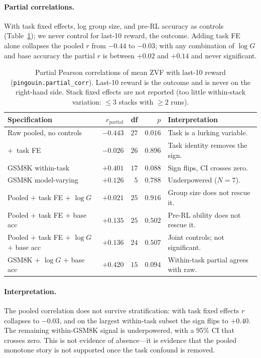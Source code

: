 \documentclass{article}
\begin{document}
\paragraph{Partial correlations.}
With task fixed effects, log group size, and pre-RL accuracy as controls
(Table~\ref{tab:zvf-partials}); we never control for last-10 reward, the
outcome. Adding task FE alone collapses the pooled $r$ from $-0.44$ to
$-0.03$; with any combination of $\log G$ and base accuracy the partial $r$
is between $+0.02$ and $+0.14$ and never significant.

\begin{table}[h]
\centering\small
\begin{tabular}{lrrrl}
\toprule
Specification & $r_{\text{partial}}$ & df & $p$ & Interpretation \\
\midrule
Raw pooled, no controls                          & $-0.443$ & $27$ & $0.016$ & Task is a lurking variable. \\
$+$~task FE                                      & $-0.026$ & $26$ & $0.896$ & Task identity removes the sign. \\
GSM8K within-task                                & $+0.401$ & $17$ & $0.088$ & Sign flips, CI crosses zero. \\
GSM8K model-varying                              & $+0.126$ & $5$  & $0.788$ & Underpowered ($N{=}7$). \\
Pooled $+$ task FE $+$ $\log G$                  & $+0.021$ & $25$ & $0.916$ & Group size does not rescue it. \\
Pooled $+$ task FE $+$ base acc                  & $+0.135$ & $25$ & $0.502$ & Pre-RL ability does not rescue it. \\
Pooled $+$ task FE $+$ $\log G$ $+$ base acc     & $+0.136$ & $24$ & $0.507$ & Joint controls; not significant. \\
GSM8K $+$ $\log G$ $+$ base acc                  & $+0.420$ & $15$ & $0.094$ & Within-task partial agrees with raw. \\
\bottomrule
\end{tabular}
\caption{Partial Pearson correlations of mean ZVF with last-10 reward
(\texttt{pingouin.partial\_corr}). Last-10 reward is the outcome and is never
on the right-hand side. Stack fixed effects are not reported (too little
within-stack variation: $\le 3$ stacks with $\ge 2$ runs).}
\label{tab:zvf-partials}
\end{table}

\paragraph{Interpretation.}
The pooled correlation does not survive stratification: with task fixed
effects $r$ collapses to $-0.03$, and on the largest within-task subset the
sign flips to $+0.40$. The remaining within-GSM8K signal is underpowered,
with a 95\% CI that crosses zero. This is not evidence of absence---it is
evidence that the pooled monotone story is not supported once the task
confound is removed.
 
\end{document}
